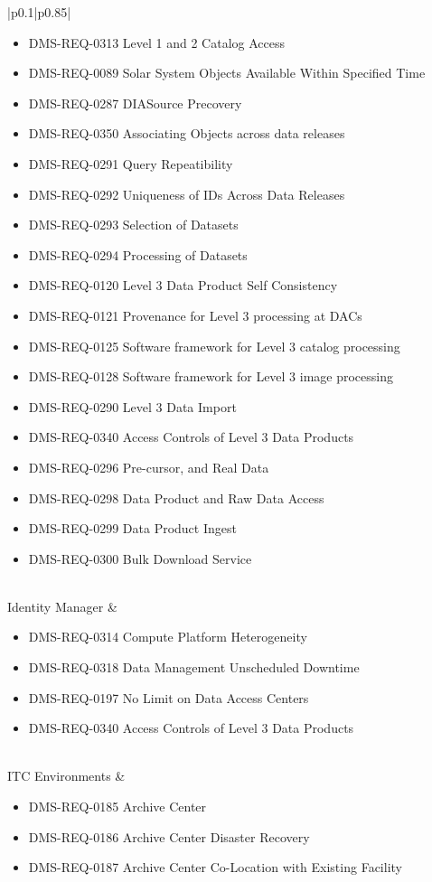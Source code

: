 \documentclass[DM,lsstdraft,toc]{lsstdoc}
\begin{document}
\begin{xtabular}{|p{0.1\textwidth}|p{0.85\textwidth}|}
\begin{itemize}
\item DMS-REQ-0313 Level 1 and 2 Catalog Access
\item DMS-REQ-0089 Solar System Objects Available Within Specified Time
\item DMS-REQ-0287 DIASource Precovery
\item DMS-REQ-0350 Associating Objects across data releases
\item DMS-REQ-0291 Query Repeatibility
\item DMS-REQ-0292 Uniqueness of IDs Across Data Releases
\item DMS-REQ-0293 Selection of Datasets
\item DMS-REQ-0294 Processing of Datasets
\item DMS-REQ-0120 Level 3 Data Product Self Consistency
\item DMS-REQ-0121 Provenance for Level 3 processing at DACs
\item DMS-REQ-0125 Software framework for Level 3 catalog processing
\item DMS-REQ-0128 Software framework for Level 3 image processing
\item DMS-REQ-0290 Level 3 Data Import
\item DMS-REQ-0340 Access Controls of Level 3 Data Products
\item DMS-REQ-0296 Pre-cursor, and Real Data
\item DMS-REQ-0298 Data Product and Raw Data Access
\item DMS-REQ-0299 Data Product Ingest
\item DMS-REQ-0300 Bulk Download Service \end{itemize} \\ \hline
Identity Manager &
\begin{itemize} \item DMS-REQ-0314 Compute Platform Heterogeneity
\item DMS-REQ-0318 Data Management Unscheduled Downtime
\item DMS-REQ-0197 No Limit on Data Access Centers
\item DMS-REQ-0340 Access Controls of Level 3 Data Products \end{itemize} \\ \hline
ITC Environments &
\begin{itemize} \item DMS-REQ-0185 Archive Center
\item DMS-REQ-0186 Archive Center Disaster Recovery
\item DMS-REQ-0187 Archive Center Co-Location with Existing Facility

\end{itemize}
\end{xtabular}
\end{document}
